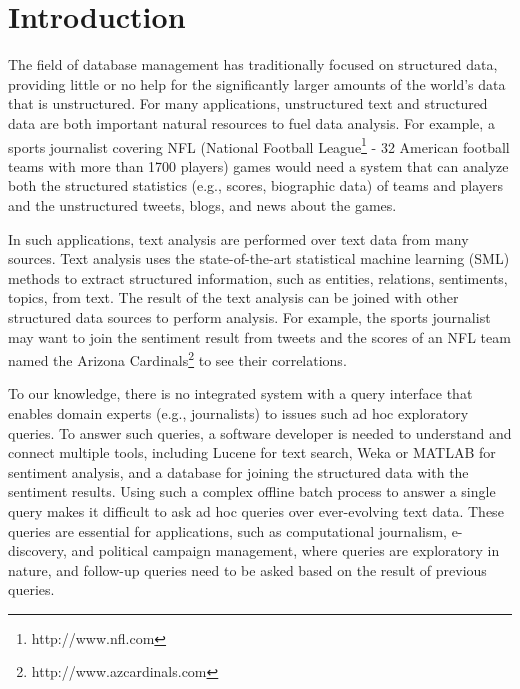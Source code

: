 
\section{Introduction}

The field of database management has traditionally focused on
structured data, providing little or no help for the significantly
larger amounts of the world's data that is unstructured. For many
applications, unstructured text and structured data are both
important natural resources to fuel data analysis. For example, a
sports journalist covering NFL (National Football
League\footnote{http://www.nfl.com} - 32 American football teams with
more than 1700 players) games would need a system that can analyze both the
structured statistics (e.g., scores, biographic data) of teams and players and the
unstructured tweets, blogs, and news about the games.

In such applications, text analysis are performed over text data
from many sources. Text analysis uses the state-of-the-art
statistical machine learning (SML) methods to extract structured
information, such as entities, relations, sentiments, topics, from
text. The result of the text analysis can be joined with other
structured data sources to perform analysis. For example, the sports
journalist may want to join the sentiment result from tweets and the
scores of an NFL team named the Arizona Cardinals\footnote{http://www.azcardinals.com} 
to see their correlations.

To our knowledge, there is no integrated system with a query
interface that enables domain experts (e.g., journalists) to issues
such ad hoc exploratory queries. To answer such queries, a software
developer is needed to understand and connect multiple tools,
including Lucene for text search, Weka or MATLAB for sentiment
analysis, and a database for joining the structured data with the
sentiment results. Using such a complex offline batch process to 
answer a single query
makes it difficult to ask ad hoc queries over ever-evolving text data. 
These queries are essential for applications, such as computational journalism,
e-discovery, and political campaign management, where queries are
exploratory in nature, and follow-up queries need to be asked based
on the result of previous queries.


